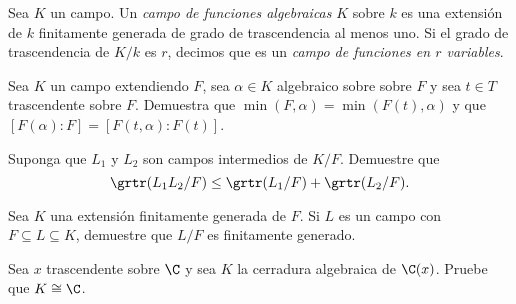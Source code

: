 \begin{definition}
  Sea $K$ un campo. Un \emph{campo de funciones algebraicas} $K$ sobre $k$ es una extensión de $k$ finitamente generada de grado de trascendencia al menos uno. Si el grado de trascendencia de $K/k$ es $r$, decimos que es un \emph{campo de funciones en $r$ variables}.
\end{definition}





\ExerciseSection

\begin{ExerciseList}
  \item Sea $K$ un campo extendiendo $F$, sea $\alpha \in K$ algebraico sobre sobre $F$ y sea $t \in T$ trascendente sobre $F$. Demuestra que $\min(F, \alpha) = \min(F(t), \alpha)$ y que $[F(\alpha) : F] = [F(t, \alpha) : F(t)]$.
  
  \item Suponga que $L_1$ y $L_2$ son campos intermedios de $K/F$. Demuestre que
  \[
    \grtr(L_1L_2/F) \leq \grtr(L_1/F) + \grtr(L_2/F).
  \]

  \item Sea $K$ una extensión finitamente generada de $F$. Si $L$ es un campo con $F \subseteq L \subseteq K$, demuestre que $L/F$ es finitamente generado.
  
  \item Sea $x$ trascendente sobre $\C$ y sea $K$ la cerradura algebraica de $\C(x)$. Pruebe que $K \cong \C$.
\end{ExerciseList}